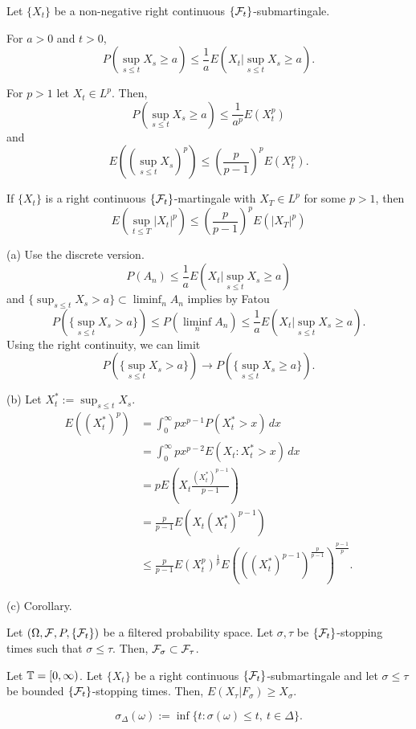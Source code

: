 \documentclass{../../../small}
\begin{document}
\begin{thm}
Let $\{X_t\}$ be a non-negative right continuous $\{\mathcal{F}_t\}$-submartingale.
\begin{parts}
\item For $a>0$ and $t>0$,
\[P(\sup_{s\le t}X_s\ge a)\le\frac1aE(X_t|\sup_{s\le t}X_s\ge a).\]
\item For $p>1$ let $X_t\in L^p$. Then,
\[P(\sup_{s\le t}X_s\ge a)\le\frac1{a^p}E(X_t^p)\]
and
\[E((\sup_{s\le t}X_s)^p)\le(\frac p{p-1})^pE(X_t^p).\]
\item If $\{X_t\}$ is a right continuous $\{\mathcal{F}_t\}$-martingale with $X_T\in L^p$ for some $p>1$, then
\[E(\sup_{t\le T}|X_t|^p)\le(\frac p{p-1})^pE(|X_T|^p)\]
\end{parts}
\end{thm}
\begin{pf}
(a)
Use the discrete version.
\[P(A_n)\le\frac1aE(X_t|\sup_{s\le t}X_s\ge a)\]
and $\{\sup_{s\le t}X_s>a\}\subset\liminf_nA_n$ implies by Fatou
\[P(\{\sup_{s\le t}X_s>a\})\le P(\liminf_nA_n)\le\frac1aE(X_t|\sup_{s\le t}X_s\ge a).\]
Using the right continuity, we can limit
\[P(\{\sup_{s\le t}X_s>a\})\to P(\{\sup_{s\le t}X_s\ge a\}).\]

(b)
Let $X_t^*:=\sup_{s\le t}X_s$.
\begin{align*}
E((X_t^*)^p)
&=\int_0^\infty px^{p-1}P(X_t^*>x)\,dx\\
&=\int_0^\infty px^{p-2}E(X_t:X_t^*>x)\,dx\\
&=pE(X_t\frac{(X_t^*)^{p-1}}{p-1})\\
&=\frac p{p-1}E(X_t(X_t^*)^{p-1})\\
&\le\frac p{p-1}E(X_t^p)^{\frac1p}E(((X_t^*)^{p-1})^{\frac p{p-1}})^{\frac{p-1}p}.
\end{align*}

(c)
Corollary.
\end{pf}

\begin{lem}
Let $(\Omega,\mathcal{F},P,\{\mathcal{F}_t\})$ be a filtered probability space.
Let $\sigma,\tau$ be $\{\mathcal{F}_t\}$-stopping times such that $\sigma\le\tau$.
Then, $\mathcal{F}_\sigma\subset\mathcal{F}_\tau$.
\end{lem}

\begin{thm}
Let $\mathbb{T}=[0,\infty)$.
Let $\{X_t\}$ be a right continuous $\{\mathcal{F}_t\}$-submartingale and let $\sigma\le\tau$ be bounded $\{\mathcal{F}_t\}$-stopping times.
Then, $E(X_\tau|F_\sigma)\ge X_\sigma$.
\end{thm}
\begin{pf}
\[\sigma_\Delta(\omega):=\inf\{t:\sigma(\omega)\le t,\ t\in\Delta\}.\]
\end{pf}





\newpage
\end{document}
